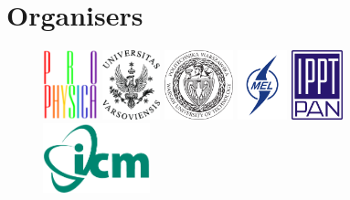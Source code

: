 \section*{Organisers}
\begin{figure}[H]%
\centering
	\includegraphics[height=2cm,keepaspectratio]{logo_organiz/prophys165x131px.pdf} \hfill
	\includegraphics[height=2cm,keepaspectratio]{logo_organiz/Logotyp_UW_lacina} \hfill
	\includegraphics[height=2cm,keepaspectratio]{logo_organiz/logo_Politechniki_Warszawskiej__NEW_POZYTYW_pol.pdf} \hfill
	\includegraphics[height=2cm,keepaspectratio]{logo_organiz/logo_meil.png} \hfill
	\includegraphics[height=2cm,keepaspectratio]{logo_organiz/oficjalne-logo-IPPT1200x1600} \hfill
	\includegraphics[height=2cm,keepaspectratio]{logo_organiz/logoICM} \hfill
\end{figure}

